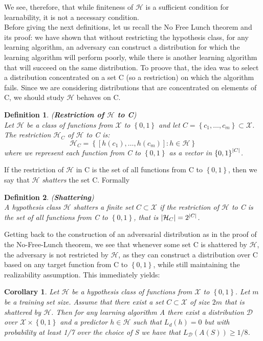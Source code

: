 \documentclass[12pt]{report}
\theoremstyle{plain}
\newtheorem{definition}{Definition}[chapter]
\newtheorem{corollary}{Corollary}[theorem]
\newcommand\mcl[1]{\mathcal{#1}}
\begin{document}
\begin{flushleft}
We see, therefore, that while finiteness of $\mcl{H}$ is a sufficient condition for learnability, it is not a necessary condition.\\
Before giving the next definitions, let us recall the No Free Lunch theorem and its proof: we have shown that without restricting the hypothesis class, for any learning algorithm, an adversary can construct a distribution for which the learning algorithm will perform poorly, while there is another learning algorithm that will succeed on the same distribution. To proove that, the idea was to select a distribution concentrated on a set C (so a restriction) on which the algorithm fails. Since we are considering distributions that are concentrated on elements of C, we should study $\mcl{H}$ behaves on C.
\begin{definition}(\textbf{Restriction of $\mcl{H}$ to C})\\
	Let $\mcl{H}$ be a class of functions from $\mcl{X}$ to $\left\{0,1\right\}$ and let $C=\left\{c_1,\dots ,c_m\right\}\subset\mcl{X}$. The restriction $\mcl{H}_C$ of $\mcl{H}$ to C is:
	\[ \mcl{H}_C=\left\{\left[h(c_1),\dots ,h(c_m)\right] :h\in\mcl{H}\right\} \]
	where we represent each function from C to $\left\{0,1\right\}$ as a vector in $\left\{0,1\right\}^\abs{C}$.
\end{definition}
If the restriction of $\mcl{H}$ in C is the set of all functions from C to $\left\{0,1\right\}$, then we say that $\mcl{H}$ \textit{shatters} the set C. Formally
\begin{definition}(\textbf{Shattering})\\
	A hypothesis class $\mcl{H}$ shatters a finite set $C\subset\mcl{X}$ if the restriction of $\mcl{H}$ to C is the set of all functions from C to $\left\{0,1\right\}$, that is $\abs{\mcl{H}_C} =2^\abs{C}$.
\end{definition}
Getting back to the construction of an adversarial distribution as in the proof of the No-Free-Lunch theorem, we see that whenever some set C is shattered by $\mcl{H}$, the adversary is not restricted by $\mcl{H}$, as they can construct a distribution over C based on any target function from C to $\left\{0,1\right\}$, while still maintaining the realizability assumption. This immediately yields:
\begin{corollary}
	Let $\mcl{H}$ be a hypothesis class of functions from $\mcl{X}$ to $\left\{0,1\right\}$. Let $m$ be a training set size. Assume that there exist a set $C\subset\mcl{X}$ of size $2m$ that is shattered by $\mcl{H}$. Then for any learning algorithm A there exist a distribution $\mcl{D}$ over $\mcl{X}\times\left\{0,1\right\}$ and a predictor $h\in\mcl{H}$ such that $L_d(h)=0$ but with probability at least 1/7 over the choice of S we have that $L_\mcl{D}(A(S))\geq 1/8$.

\end{corollary}
\end{flushleft}
\end{document}
